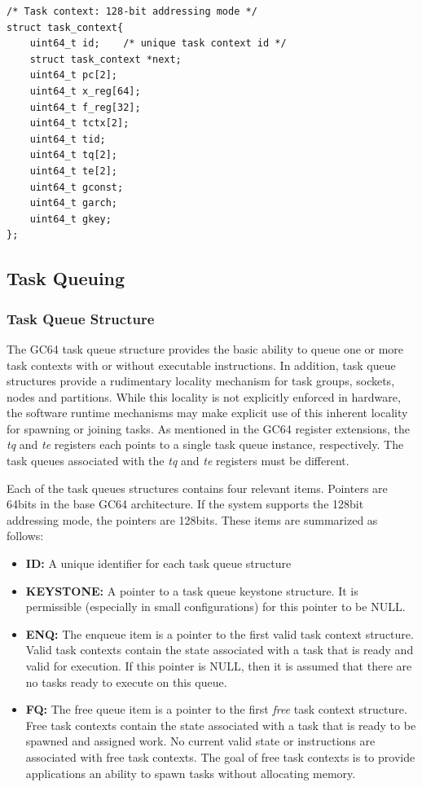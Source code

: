 \documentclass{article}
\begin{document}
\begin{verbatim}
/* Task context: 128-bit addressing mode */
struct task_context{
	uint64_t id;	/* unique task context id */
	struct task_context *next;
	uint64_t pc[2];
	uint64_t x_reg[64];
	uint64_t f_reg[32];
	uint64_t tctx[2];
	uint64_t tid;
	uint64_t tq[2];
	uint64_t te[2];
	uint64_t gconst;
	uint64_t garch;
	uint64_t gkey;
};
\end{verbatim}

\subsection{Task Queuing}

\subsubsection{Task Queue Structure}

The GC64 task queue structure provides the basic ability to queue one or more task contexts with or without executable instructions.  In addition, task queue structures provide a rudimentary locality mechanism for task groups, sockets, nodes and partitions.  While this locality is not explicitly enforced in hardware, the software runtime mechanisms may make explicit use of this inherent locality for spawning or joining tasks.  As mentioned in the GC64 register extensions, the \emph{tq} and \emph{te} registers each points to a single task queue instance, respectively.  The task queues associated with the \emph{tq} and \emph{te} registers must be different.      

Each of the task queues structures contains four relevant items.  Pointers are 64bits in the base GC64 architecture.  If the system supports the 128bit addressing mode, the pointers are 128bits.  These items are summarized as follows: 

\begin{itemize}
\item \textbf{ID:} A unique identifier for each task queue structure
\item \textbf{KEYSTONE:} A pointer to a task queue keystone structure.  It is permissible (especially in small configurations) for this pointer to be NULL.   
\item \textbf{ENQ:} The enqueue item is a pointer to the first valid task context structure.  Valid task contexts contain the state associated with a task that is ready and valid for execution.  If this pointer is NULL, then it is assumed that there are no tasks ready to execute on this queue.  
\item \textbf{FQ:} The free queue item is a pointer to the first \emph{free} task context structure.  Free task contexts contain the state associated with a task that is ready to be spawned and assigned work.  No current valid state or instructions are associated with free task contexts.  The goal of free task contexts is to provide applications an ability to spawn tasks without allocating memory.  
\end{itemize}
\end{document}
